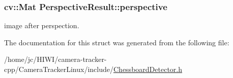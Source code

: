 \subsubsection[{\texorpdfstring{perspective}{perspective}}]{\setlength{\rightskip}{0pt plus 5cm}cv\+::\+Mat Perspective\+Result\+::perspective}\hypertarget{struct_perspective_result_af3e15ad54fa2f84ad2d782a2f0fd6e73}{}\label{struct_perspective_result_af3e15ad54fa2f84ad2d782a2f0fd6e73}
image after perspection. 

The documentation for this struct was generated from the following file\+:\begin{DoxyCompactItemize}
\item 
/home/jc/\+H\+I\+W\+I/camera-\/tracker-\/cpp/\+Camera\+Tracker\+Linux/include/\hyperlink{_chessboard_detector_8h}{Chessboard\+Detector.\+h}\end{DoxyCompactItemize}
